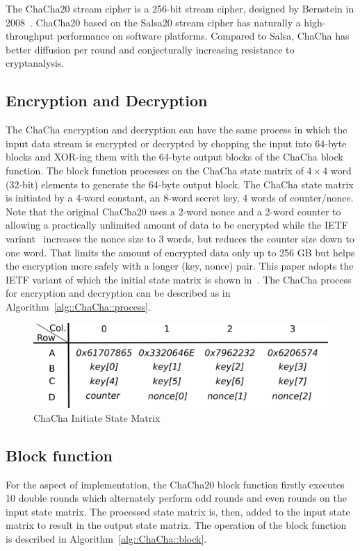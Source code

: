The ChaCha20 stream cipher is a 256-bit stream cipher, designed by Bernstein in 2008~\cite{Ber:08}.
ChaCha20 based on the Salsa20 stream cipher has naturally a high-throughput performance on software platforms.
Compared to Salsa, ChaCha has better diffusion per round and conjecturally increasing resistance to cryptanalysis. 

\subsection{Encryption and Decryption}
The ChaCha encryption and decryption can have the same process in which the input data stream is encrypted or decrypted by chopping the input into 64-byte blocks and XOR-ing them with the 64-byte output blocks of the ChaCha block function. The block function processes on the ChaCha state matrix of $4\times4$ word (32-bit) elements to generate the 64-byte output block.
The ChaCha state matrix is initiated by a 4-word constant, an 8-word secret key, 4 words of counter/nonce. 
Note that the original ChaCha20 uses a 2-word nonce and a 2-word counter to allowing a practically unlimited amount of data to be encrypted while the IETF variant~\cite{RFC:18} increases the nonce size to 3 words, but reduces the counter size down to one word.
That limits the amount of encrypted data only up to 256 GB but helps the encryption more safely with a longer (key, nonce) pair. 
This paper adopts the IETF variant of which the initial state matrix is shown in~.
The ChaCha process for encryption and decryption can be described as in Algorithm~\ref{alg::ChaCha::process}.

\begin{figure}
	\centering
	\includegraphics[scale=0.5]{figures/ChaChaState.png}
	\caption{ChaCha Initiate State Matrix}
	\vspace{-10pt}
	\label{fig:bg:ChaChaMatix}
\end{figure}

\subsection{Block function}
For the aspect of implementation, the ChaCha20 block function firstly executes 10 double rounds which alternately perform odd rounds and even rounds on the input state matrix. The processed state matrix is, then, added to the input state matrix to result in the output state matrix. The operation of the block function is described in Algorithm~\ref{alg::ChaCha::block}.

